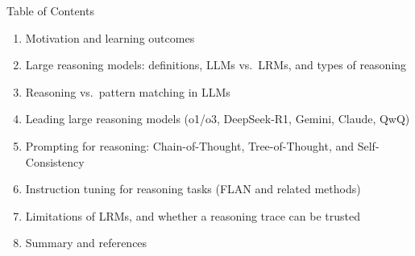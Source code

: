 \begin{frame}{Table of Contents}
  \begin{enumerate}\itemsep0.15em
    \item Motivation and learning outcomes
    \item Large reasoning models: definitions, LLMs vs.\ LRMs, and types of reasoning
    \item Reasoning vs.\ pattern matching in LLMs
    \item Leading large reasoning models (o1/o3, DeepSeek-R1, Gemini, Claude, QwQ)
    \item Prompting for reasoning: Chain-of-Thought, Tree-of-Thought, and Self-Consistency
    \item Instruction tuning for reasoning tasks (FLAN and related methods)
    \item Limitations of LRMs, and whether a reasoning trace can be trusted
    \item Summary and references
  \end{enumerate}
\end{frame}

